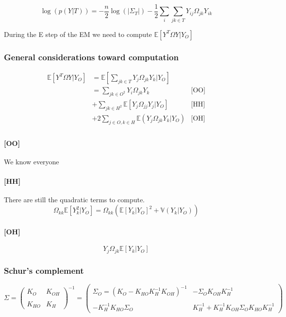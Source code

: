 \documentclass[11pt,a4paper]{article}
\newcommand{\Esp}{\mathds{E}}
\begin{document}
$$\log(p(Y|T)) = -\frac{n}{2}\log(|\Sigma_T|) - \frac{1}{2} \sum_i\sum_{jk\in T} Y_{ij} \Omega_{jk} Y_{ik}$$

During the E step of the EM we need to compute $\Esp[Y^T\Omega Y|Y_O]$
\subsubsection{General considerations toward computation}
\begin{align*}
 \Esp[Y^T\Omega Y|Y_O] &=\Esp\left[\sum_{jk\in T } Y_j\Omega_{jk}Y_k|Y_O\right]&\\
& = \sum_{jk\in O^2} Y_i\Omega_{jk} Y_k & \text{[OO]}\\
&+\sum_{jk \in H^2} \Esp[Y_j\Omega_{jj}Y_j|Y_O] & \text{[HH]} \\
&+2 \sum_{j\in O, k \in H} \Esp(Y_j\Omega_{jk} Y_k |Y_O) & \text{[OH]}\\
\end{align*}

\paragraph{[OO]} We know everyone
\paragraph{[HH]} There are still the quadratic terms to compute. 
$$ \Omega_{kk} \Esp[Y_k^2|Y_O] = \Omega_{kk} \left( \Esp [Y_k|Y_O]^2 + \mathds{V}(Y_k|Y_O)\right)$$

\paragraph{[OH]}$$ Y_j\Omega_{jk}\Esp[Y_k|Y_O]$$

\subsubsection{Schur's complement}

\[
 \Sigma=
  \left( {\begin{array}{cc}
  K_O &  K_{OH}\\\\
  K_{HO} & K_H
  \end{array} } \right)^{-1} =
  \left( {\begin{array}{cc}
  \Sigma_O =( K_O - K_{HO}K_H^{-1}K_{OH})^{-1} &  - \Sigma_O K_{OH}K_H^{-1}\\\\
 -K_H^{-1}K_{HO}\Sigma_O & K_H^{-1}+K_H^{-1}K_{OH}\Sigma_OK_{HO}K_H^{-1}
  \end{array} } \right)
  \]
\end{document}
